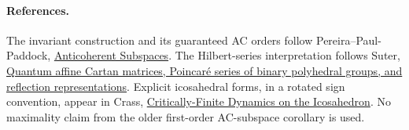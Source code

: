 \documentclass[11pt]{article}
\begin{document}
\paragraph{References.}
The invariant construction and its guaranteed AC orders follow
Pereira--Paul-Paddock, \href{https://arxiv.org/abs/1610.05841}{Anticoherent
Subspaces}. The Hilbert-series interpretation follows Suter,
\href{https://arxiv.org/abs/math/0503542}{Quantum affine Cartan matrices,
Poincar\'e series of binary polyhedral groups, and reflection
representations}. Explicit icosahedral forms, in a rotated sign convention,
appear in Crass, \href{https://doi.org/10.3390/sym12010177}{Critically-Finite
Dynamics on the Icosahedron}. No maximality claim from the older
first-order AC-subspace corollary is used.
\end{document}
